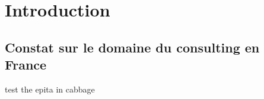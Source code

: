 \chapter{Introduction}

\section{Constat sur le domaine du consulting en France}

test the \gls{epita} in \gls{cabbage}

\clearpage
